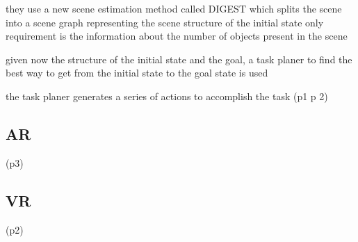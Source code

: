 \documentclass[conference]{IEEEtran}
\begin{document}
        they use a new scene estimation method called DIGEST which splits the scene into a scene graph representing the scene structure of the initial state
        only requirement is the information about the number of objects present in the scene

        given now the structure of the initial state and the goal, a task planer to find the best way to get from the initial state to the goal state is used

        the task planer generates a series of actions to accomplish the task
        (p1 p 2)

    \subsection{AR}
    
        (p3)

    \subsection{VR}

        (p2)









\nocite{*}



\end{document}
